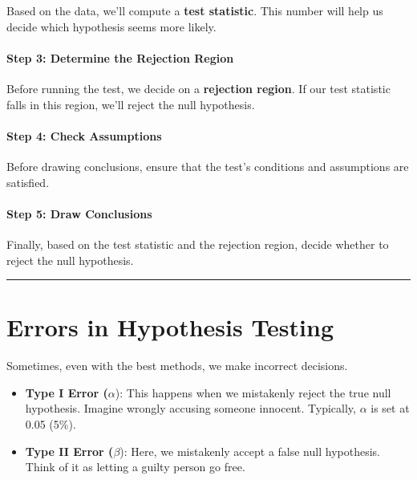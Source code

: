 \documentclass[
  letterpaper,
  DIV=11,
  numbers=noendperiod]{scrartcl}
\let\oldparagraph\paragraph
\renewcommand{\paragraph}[1]{\oldparagraph{#1}\mbox{}}
\begin{document}
Based on the data, we'll compute a \textbf{test statistic}. This number
will help us decide which hypothesis seems more likely.

\hypertarget{step-3-determine-the-rejection-region}{%
\paragraph{Step 3: Determine the Rejection
Region}\label{step-3-determine-the-rejection-region}}

Before running the test, we decide on a \textbf{rejection region}. If
our test statistic falls in this region, we'll reject the null
hypothesis.

\hypertarget{step-4-check-assumptions}{%
\paragraph{Step 4: Check Assumptions}\label{step-4-check-assumptions}}

Before drawing conclusions, ensure that the test's conditions and
assumptions are satisfied.

\hypertarget{step-5-draw-conclusions}{%
\paragraph{Step 5: Draw Conclusions}\label{step-5-draw-conclusions}}

Finally, based on the test statistic and the rejection region, decide
whether to reject the null hypothesis.

\begin{center}\rule{0.5\linewidth}{0.5pt}\end{center}

\hypertarget{errors-in-hypothesis-testing}{%
\section{Errors in Hypothesis
Testing}\label{errors-in-hypothesis-testing}}

Sometimes, even with the best methods, we make incorrect decisions.

\begin{itemize}
\item
  \textbf{Type I Error (}\(\alpha\)): This happens when we mistakenly
  reject the true null hypothesis. Imagine wrongly accusing someone
  innocent. Typically, \(\alpha\) is set at 0.05 (5\%).
\item
  \textbf{Type II Error (}\(\beta\)): Here, we mistakenly accept a false
  null hypothesis. Think of it as letting a guilty person go free.
\end{itemize}
\end{document}
